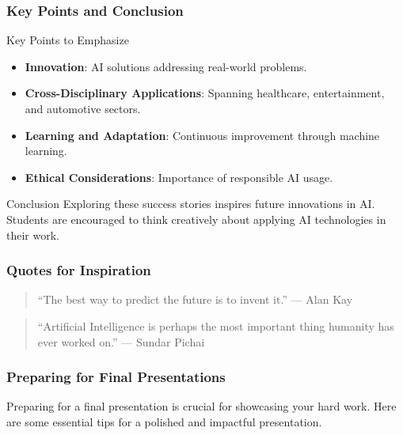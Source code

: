 \documentclass[aspectratio=169]{beamer}
\begin{document}
\begin{frame}[fragile]
    \frametitle{Key Points and Conclusion}
    \begin{block}{Key Points to Emphasize}
        \begin{itemize}
            \item \textbf{Innovation}: AI solutions addressing real-world problems.
            \item \textbf{Cross-Disciplinary Applications}: Spanning healthcare, entertainment, and automotive sectors.
            \item \textbf{Learning and Adaptation}: Continuous improvement through machine learning.
            \item \textbf{Ethical Considerations}: Importance of responsible AI usage.
        \end{itemize}
    \end{block}

    \begin{block}{Conclusion}
        Exploring these success stories inspires future innovations in AI. Students are encouraged to think creatively about applying AI technologies in their work.
    \end{block}
\end{frame}

\begin{frame}[fragile]
    \frametitle{Quotes for Inspiration}
    \begin{quote}
        “The best way to predict the future is to invent it.” — Alan Kay
    \end{quote}
    \begin{quote}
        “Artificial Intelligence is perhaps the most important thing humanity has ever worked on.” — Sundar Pichai
    \end{quote}
\end{frame}

\begin{frame}
    \frametitle{Preparing for Final Presentations}
    Preparing for a final presentation is crucial for showcasing your hard work. Here are some essential tips for a polished and impactful presentation.
\end{frame}
\end{document}
